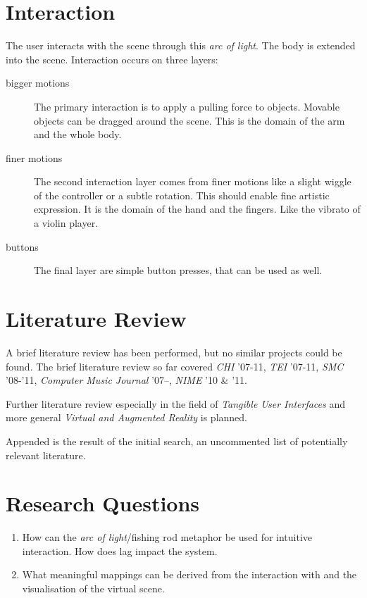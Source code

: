 \documentclass[10pt,a4paper]{scrartcl}
\begin{document}
\section{Interaction}
The user interacts with the scene through this \emph{arc of light}. The body is extended into the scene. Interaction occurs on three layers:

\begin{description}
\item[bigger motions] The primary interaction is to apply a pulling force to objects. Movable objects can be dragged around the scene. This is the domain of the arm and the whole body.

\item[finer motions] The second interaction layer comes from finer motions like a slight wiggle of the controller or a subtle rotation. This should enable fine artistic expression. It is the domain of the hand and the fingers. Like the vibrato of a violin player. 

\item[buttons] The final layer are simple button presses, that can be used as well.
\end{description}

\section{Literature Review}
A brief literature review has been performed, but no similar projects could be found. The brief literature review so far covered  \emph{CHI} '07-11, \emph{TEI} '07-11, \emph{SMC} '08-'11, \emph{Computer Music Journal} '07--, \emph{NIME} '10 \& '11.

Further literature review especially in the field of \emph{Tangible User Interfaces} and more general \emph{Virtual and Augmented Reality} is planned.

Appended is the result of the initial search, an uncommented list of potentially relevant literature.

\section{Research Questions}
\begin{enumerate}
\item How can the \emph{arc of light}/fishing rod metaphor be used for intuitive interaction. How does lag impact the system.
\item What meaningful mappings can be derived from the interaction with and the visualisation of the virtual scene.
\end{enumerate}
\end{document}
